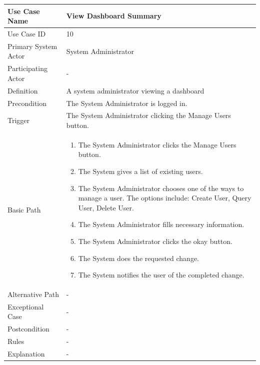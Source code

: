 \documentclass[a4paper,12pt]{report}
\begin{document}
		\begin{tabular}{|m{4cm}|m{11.5cm}|}
			\hline
				Use Case Name & View Dashboard Summary\\
			\hline
				Use Case ID & 10\\
			\hline
				Primary System Actor & System Administrator\\
			\hline
				Participating Actor & -\\
			\hline
				Definition & A system administrator viewing a dashboard \\
			\hline
				Precondition & The System Administrator is logged in.\\
			\hline
				Trigger & The System Administrator clicking the Manage Users button.\\
			\hline
				Basic Path & \begin{enumerate}
					\item The System Administrator clicks the Manage Users button.
					\item The System gives a list of existing users.
					\item The System Administrator chooses one of the ways to manage a user. The options include: Create User, Query User, Delete User.
					\item The System Administrator fills necessary information.
					\item The System Administrator clicks the okay button.
					\item The System does the requested change.
					\item The System notifies the user of the completed change.
				\end{enumerate}		
				\\
			\hline
				Alternative Path & -\\
			\hline
				Exceptional Case & -\\
			\hline
				Postcondition & -\\
			\hline
				Rules & -\\
			\hline
				Explanation & -\\
			\hline
		\end{tabular}
\end{document}
